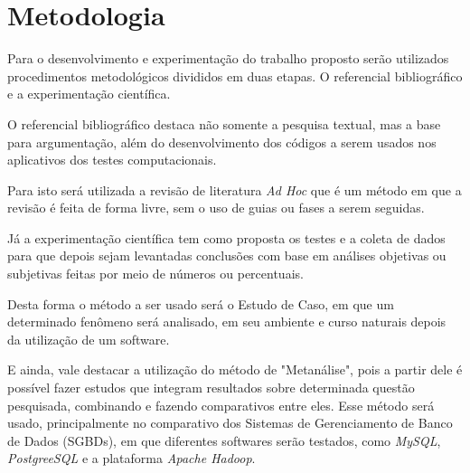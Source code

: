 

 

\section {Metodologia}
Para o desenvolvimento e experimentação do trabalho proposto serão utilizados procedimentos metodológicos divididos em duas etapas. O referencial bibliográfico e a experimentação científica.

O referencial bibliográfico destaca não somente a pesquisa textual, mas a base para argumentação, além do desenvolvimento dos códigos a serem usados nos aplicativos dos testes computacionais.

Para isto será utilizada a revisão de literatura \textit{Ad Hoc} que é um método em que a revisão é feita de forma livre, sem o uso de guias ou fases a serem seguidas\cite{Jacobsen-metodologia}.

Já a experimentação científica tem como proposta os testes e a coleta de dados para que depois sejam levantadas conclusões com base em análises objetivas ou subjetivas feitas por meio de números ou percentuais.

Desta forma o método a ser usado será o Estudo de Caso, em que um determinado fenômeno será analisado, em seu ambiente e curso naturais depois da utilização de um software\cite{Jacobsen-metodologia}.

E ainda, vale destacar a utilização do método de "Metanálise", pois a partir dele é possível fazer estudos que integram resultados sobre determinada questão pesquisada, combinando e fazendo comparativos entre eles\cite{Jacobsen-metodologia}. Esse método será usado, principalmente no comparativo dos Sistemas de Gerenciamento de Banco de Dados (SGBDs), em que diferentes softwares serão testados, como \textit{MySQL}, \textit{PostgreeSQL} e a plataforma \textit{Apache Hadoop}. 

